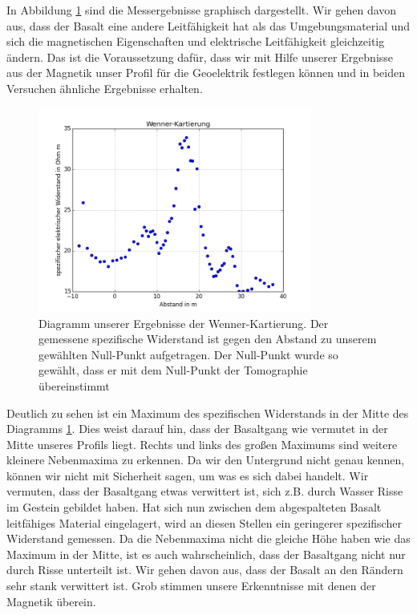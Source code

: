 In Abbildung \ref{abb:Wennerdiagr} sind die Messergebnisse
graphisch dargestellt. Wir gehen davon aus, dass der Basalt eine andere Leitfähigkeit hat als das Umgebungsmaterial und sich die magnetischen Eigenschaften und elektrische Leitfähigkeit 
gleichzeitig ändern. Das ist die Voraussetzung dafür, dass wir mit Hilfe unserer Ergebnisse aus der Magnetik unser Profil für die Geoelektrik festlegen können und in beiden Versuchen ähnliche Ergebnisse erhalten.

\begin{figure}[ht]
\centering
\includegraphics[width=0.8\textwidth]{fig/wennerkartierung.png}
\caption[Diagramm unserer Ergebnisse der Wenner-Kartierung]{Diagramm unserer Ergebnisse der Wenner-Kartierung. Der gemessene spezifische Widerstand ist gegen den Abstand zu unserem gewählten Null-Punkt aufgetragen. Der Null-Punkt wurde so gewählt, dass er mit dem Null-Punkt der Tomographie übereinstimmt}
\label{abb:Wennerdiagr}
\end{figure}

Deutlich zu sehen ist ein Maximum des spezifischen Widerstands in der Mitte des Diagramms \ref{abb:Wennerdiagr}.
Dies weist darauf hin, dass der Basaltgang wie vermutet in der Mitte unseres Profils liegt.
Rechts und links des großen Maximums sind weitere kleinere Nebenmaxima zu erkennen. Da wir den Untergrund nicht genau kennen, können wir nicht mit Sicherheit sagen, um was es sich dabei handelt. Wir vermuten, dass der Basaltgang etwas verwittert 
ist, sich z.B. durch Wasser Risse im Gestein gebildet haben. Hat sich nun zwischen dem abgespalteten Basalt leitfähiges Material eingelagert, wird an diesen Stellen ein geringerer spezifischer Widerstand gemessen.
Da die Nebenmaxima nicht die gleiche Höhe haben wie das Maximum in der Mitte, ist es auch wahrscheinlich, dass der Basaltgang nicht nur durch Risse unterteilt ist. Wir gehen davon aus, dass der Basalt an den Rändern sehr stank verwittert ist.
Grob stimmen unsere Erkenntnisse mit denen der Magnetik überein.

